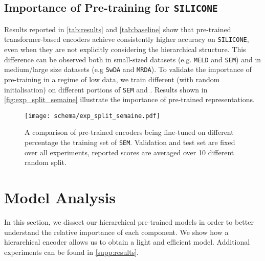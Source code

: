 \documentclass[11pt,a4paper]{article}
\begin{document}
\subsection{Importance of Pre-training for \texttt{SILICONE}} Results reported in \autoref{tab:results} and \autoref{tab:baseline} show that pre-trained transformer-based encoders achieve consistently higher accuracy on \texttt{SILICONE}, even when they are not explicitly considering the hierarchical structure.
This difference can be observed both in small-sized datasets (e.g. \texttt{MELD} and \texttt{SEM}) and in medium/large size datasets (e.g \texttt{SwDA} and \texttt{MRDA}).
To validate the importance of pre-training in a regime of low data, we train different  (with random initialisation) on different portions of \texttt{SEM} and .
Results shown in \autoref{fig:exp_split_semaine} illustrate the importance of pre-trained representations.
\begin{figure}
  \centering
  \texttt{[image: schema/exp\_split\_semaine.pdf]}
    \caption{A comparison of pre-trained encoders being fine-tuned on different percentage the training set of \texttt{SEM}. Validation and test set are fixed over all experiments, reported scores are averaged over 10 different random split.}
    \label{fig:exp_split_semaine}
\end{figure}
\section{Model Analysis}
In this section, we dissect our hierarchical pre-trained models in order to better understand the relative importance of each component. We show how a hierarchical encoder allows us to obtain a light and efficient model. Additional experiments can be found in \autoref{supp:results}.
\end{document}

